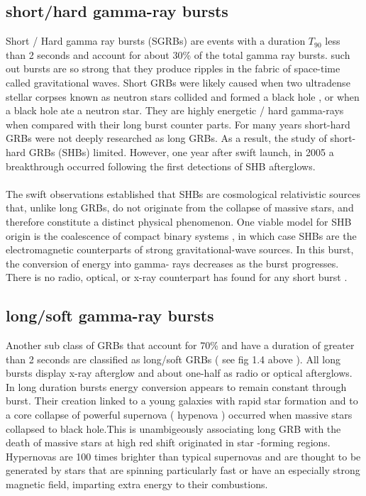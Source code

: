 \subsection{short/hard gamma-ray bursts} 
Short / Hard  gamma  ray  bursts  (SGRBs)  are  events  with  a duration $T_{90}$ less than 2 seconds  and  account for  about  30\%  of  the total  gamma  ray  bursts. such  out  bursts   are so strong  that  they  produce   ripples in the  fabric of space-time  called   gravitational  waves.  Short  GRBs  were  likely  caused  when  two  ultradense  stellar  corpses   known  as  neutron  stars  collided  and formed a black hole , or  when   a black  hole   ate  a neutron  star.  They  are  highly  energetic / hard   gamma-rays  when  compared  with their  long  burst  counter  parts. For  many years  short-hard  GRBs  were  not  deeply   researched as long  GRBs. As a result, the  study  of short-hard  GRBs (SHBs) limited.  However, one  year  after  swift  launch, in 2005 a breakthrough  occurred  following  the first  detections  of  SHB  afterglows.  \citep{5} \citep{  6   } \\\\   
The  swift  observations  established that SHBs are  cosmological relativistic sources  that, unlike long GRBs, do not originate from the collapse of massive stars, and  therefore  constitute  a distinct  physical  phenomenon. One viable  model for SHB  origin  is  the  coalescence  of  compact  binary systems , in which case SHBs are   the  electromagnetic  counterparts of strong  gravitational-wave sources. In this  burst, the  conversion  of  energy  into gamma- rays  decreases  as  the burst progresses. There  is  no  radio,  optical, or  x-ray  counterpart  has  found  for any  short  burst \citep{5}.
\subsection{long/soft gamma-ray bursts}
Another  sub  class  of  GRBs  that  account for 70\%  and  have  a duration  of greater  than 2 seconds  are  classified  as long/soft  GRBs ( see fig 1.4 above ).  All long  bursts  display  x-ray  afterglow  and  about  one-half  as  radio  or  optical  afterglows. In  long  duration  bursts  energy  conversion  appears  to  remain  constant  through  burst. Their  creation  linked  to  a young  galaxies  with  rapid  star  formation  and  to  a core  collapse  of  powerful supernova ( hypenova )  occurred  when  massive stars  collapsed to black hole.This is  unambigeously   associating  long  GRB  with  the  death  of  massive  stars at high red  shift  originated  in  star -forming  regions.  Hypernovas  are  100  times  brighter  than  typical  supernovas  and  are  thought  to  be  generated  by  stars  that   are   spinning   particularly  fast  or  have  an  especially  strong  magnetic  field,  imparting   extra  energy  to  their  combustions.\citep{ 6 } 
